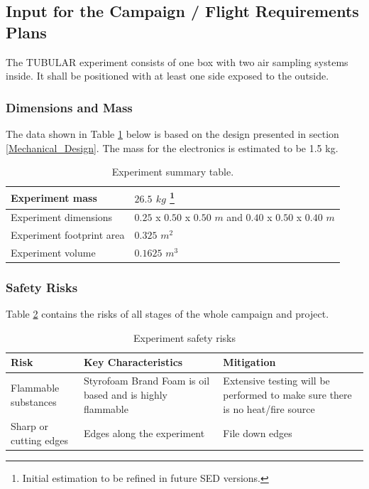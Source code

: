 \documentclass[a4paper,12pt,twoside]{article}
\begin{document}
\subsection{Input for the Campaign / Flight Requirements Plans}

The TUBULAR experiment consists of one box with two air sampling systems inside. It shall be positioned with at least one side exposed to the outside.

\subsubsection{Dimensions and Mass}

The data shown in Table \ref{dimensions_mass} below is based on the design presented in section \ref{Mechanical_Design}.  The mass for the electronics is estimated to be 1.5 kg.  

\begin{table}[!ht]
\centering
\begin{tabular}{|l|l|}
\hline
 Experiment mass  & $26.5$ $kg$ \footnote[13]{Initial estimation to be refined in future SED versions.} \\ \hline
 Experiment dimensions & $0.25$ x $0.50$ x $0.50$ $m$ and $0.40$ x $0.50$ x $0.40$ $m$ \\ \hline
 Experiment footprint area & $0.325$ $m^2$ \\ \hline
 Experiment volume  & $0.1625$ $m^3$ \\ \hline
\end{tabular}
\caption{Experiment summary table.}
\label{dimensions_mass}
\end{table}
\raggedbottom

\subsubsection{Safety Risks}
Table \ref{tab:safrisk} contains the risks of all stages of the whole campaign and project.
\begin{table}[H]
\centering

\begin{tabular}{|m{}|m{}|m{}|}
\hline
\textbf{Risk}          & \textbf{Key Characteristics}                              & \textbf{Mitigation}                                                           \\ \hline
Flammable substances    & Styrofoam Brand Foam is oil based and is highly flammable & Extensive testing will be performed to make sure there is no heat/fire source \\ \hline
Sharp or cutting edges & Edges along the experiment                                & File down edges                                                               \\ \hline
\end{tabular}
\caption{Experiment safety risks}
\label{tab:safrisk}
\end{table}
\raggedbottom
\end{document}
